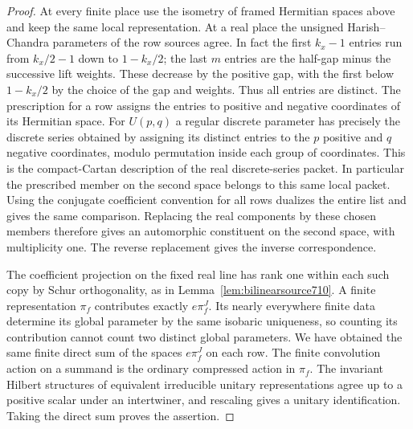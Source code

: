 \documentclass[a4paper,11pt]{article}
\theoremstyle{definition}
\theoremstyle{remark}
\numberwithin{equation}{section}
\begin{document}
\begin{proof}
At every finite place use the isometry of framed Hermitian
spaces above and keep the same local representation. At a
real place the unsigned Harish--Chandra parameters of the
row sources agree. In fact the first \(k_x-1\) entries run
from \(k_x/2-1\) down to \(1-k_x/2\); the last \(m\) entries
are the half-gap minus the successive lift weights. These
decrease by the positive gap, with the first below \(1-k_x/2\)
by the choice of the gap and weights. Thus all entries are
distinct. The prescription for a row assigns the entries to
positive and negative coordinates of its Hermitian space.
For \(U(p,q)\) a regular discrete parameter has precisely the
discrete series obtained by assigning its distinct entries to
the \(p\) positive and \(q\) negative coordinates, modulo
permutation inside each group of coordinates. This is the
compact-Cartan description of the real discrete-series
packet. In particular the prescribed member on the second
space belongs to this same local packet. Using the conjugate
coefficient convention for all rows dualizes the entire list
and gives the same comparison. Replacing the real components
by these chosen members therefore gives an automorphic
constituent on the second space, with multiplicity one. The
reverse replacement gives the inverse correspondence.

The coefficient projection on the fixed real line has rank
one within each such copy by Schur orthogonality, as in
Lemma~\ref{lem:bilinearsource710}. A finite representation
\(\pi_f\) contributes exactly \(e\pi_f^J\). Its nearly
everywhere finite data determine its global parameter by
the same isobaric uniqueness, so counting its contribution
cannot count two distinct global parameters. We have obtained
the same finite direct sum of the spaces \(e\pi_f^J\) on
each row. The finite convolution action on a summand is the
ordinary compressed action in \(\pi_f\). The invariant
Hilbert structures of equivalent irreducible unitary
representations agree up to a positive scalar under an
intertwiner, and rescaling gives a unitary identification.
Taking the direct sum proves the assertion.
\end{proof}
\end{document}
